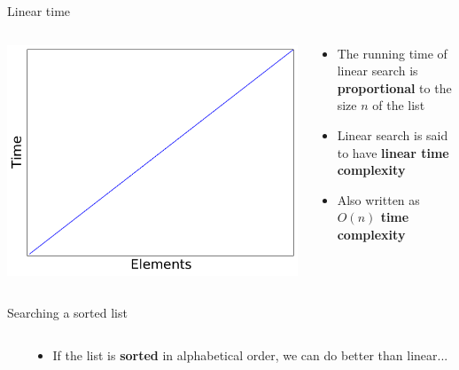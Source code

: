 \begin{frame}{Linear time}
	\begin{columns}
		\begin{column}{0.45\textwidth}
			\includegraphics[width=\textwidth]{plot2_linear}
		\end{column}
		\begin{column}{0.55\textwidth}
			\begin{itemize}
				\item The running time of linear search is \textbf{proportional} to the size $n$ of the list \pause
				\item Linear search is said to have \textbf{linear time complexity} \pause
				\item Also written as \textbf{$O(n)$ time complexity}
			\end{itemize}
		\end{column}
	\end{columns}
\end{frame}

\begin{frame}{Searching a sorted list}
	\begin{columns}
		\begin{column}{0.3\textwidth}
			\namessorted
		\end{column}
		\begin{column}{0.66\textwidth}
			\begin{itemize}
				\item If the list is \textbf{sorted} in alphabetical order, we can do better than linear...
			\end{itemize}
		\end{column}
	\end{columns}
\end{frame}

